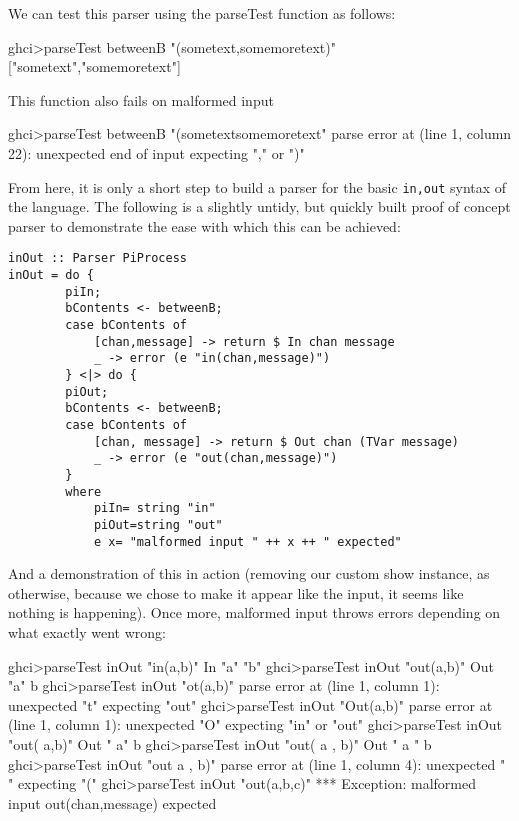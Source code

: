 We can test this parser using the parseTest function as follows:

\begin{code}
    ghci>parseTest betweenB "(sometext,somemoretext)"
    ["sometext","somemoretext"]
\end{code}

This function also fails on malformed input

\begin{code}
    ghci>parseTest betweenB "(sometextsomemoretext"
    parse error at (line 1, column 22):
    unexpected end of input
    expecting "," or ")"
\end{code}

From here, it is only a short step to build a parser for the basic \verb!in,out! syntax of the language. The following is a slightly untidy, but quickly built proof of concept parser to demonstrate the ease with which this can be achieved:

\begin{verbatim}
inOut :: Parser PiProcess
inOut = do {
        piIn;
        bContents <- betweenB;
        case bContents of
            [chan,message] -> return $ In chan message
            _ -> error (e "in(chan,message)")
        } <|> do {
        piOut;
        bContents <- betweenB;
        case bContents of
            [chan, message] -> return $ Out chan (TVar message)
            _ -> error (e "out(chan,message)")
        }
        where
            piIn= string "in"
            piOut=string "out" 
            e x= "malformed input " ++ x ++ " expected"
\end{verbatim}

And a demonstration of this in action (removing our custom show instance, as otherwise, because we chose to make it appear like the input, it seems like nothing is happening). Once more, malformed input throws errors depending on what exactly went wrong: 

\begin{code}
    ghci>parseTest inOut "in(a,b)"
    In "a" "b"
    ghci>parseTest inOut "out(a,b)"
    Out "a" b
    ghci>parseTest inOut "ot(a,b)"
    parse error at (line 1, column 1):
    unexpected "t"
    expecting "out"
    ghci>parseTest inOut "Out(a,b)"
    parse error at (line 1, column 1):
    unexpected "O"
    expecting "in" or "out"
    ghci>parseTest inOut "out( a,b)"
    Out " a" b
    ghci>parseTest inOut "out( a ,      b)"
    Out " a "       b
    ghci>parseTest inOut "out  a ,      b)"
    parse error at (line 1, column 4):
    unexpected " "
    expecting "("
    ghci>parseTest inOut "out(a,b,c)"
    *** Exception: malformed input out(chan,message) expected
\end{code}

